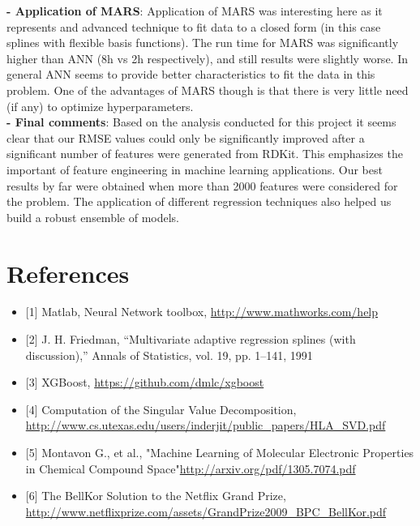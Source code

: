 \documentclass{article}
\begin{document}
\textbf{- Application of MARS}: Application of MARS was interesting here as it represents and advanced technique to fit data to a closed form (in this case splines with flexible basis functions). The run time for MARS was significantly higher than ANN (8h vs 2h respectively), and still results were slightly worse. In general ANN seems to provide better characteristics to fit the data in this problem. One of the advantages of MARS though is that there is very little need (if any) to optimize hyperparameters. \\

\textbf{- Final comments}: Based on the analysis conducted for this project it seems clear that our RMSE values could only be significantly improved after a significant number of features were generated from RDKit. This emphasizes the important of feature engineering in machine learning applications. Our best results by far were obtained when more than 2000 features were considered for the problem. The application of different regression techniques also helped us build a robust ensemble of models.

\section*{References}
\fontsize{7pt}{7pt}\selectfont
\begin{itemize}
  \item {[1] Matlab, Neural Network toolbox, \url{http://www.mathworks.com/help}}
  \item {[2] J. H. Friedman, “Multivariate adaptive regression splines (with discussion),” Annals of Statistics, vol. 19, pp. 1–141, 1991}
	\item {[3] XGBoost, \url{https://github.com/dmlc/xgboost}}
	\item {[4] Computation of the Singular Value Decomposition, \url{http://www.cs.utexas.edu/users/inderjit/public_papers/HLA_SVD.pdf}}
  \item {[5] Montavon G., et al., "Machine Learning of Molecular Electronic Properties in Chemical Compound Space"\url{http://arxiv.org/pdf/1305.7074.pdf}}
	\item {[6] The BellKor Solution to the Netflix Grand Prize, \url{http://www.netflixprize.com/assets/GrandPrize2009_BPC_BellKor.pdf}}

\end{itemize}
\end{document}
